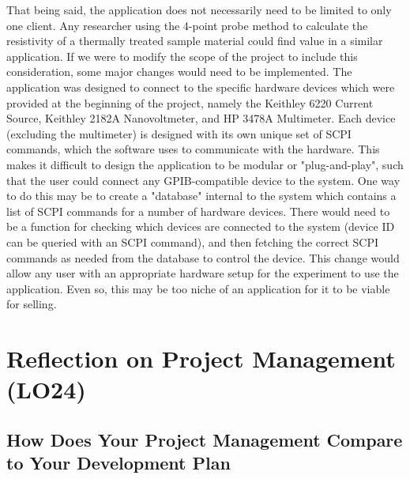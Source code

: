 \documentclass{article}
\begin{document}
\noindent That being said, the application does not necessarily need to be limited to only one client. Any researcher using the 4-point probe method to calculate the resistivity of a thermally treated sample material could find value in a similar application. If we were to modify the scope of the project to include this consideration, some major changes would need to be implemented. The application was designed to connect to the specific hardware devices which were provided at the beginning of the project, namely the Keithley 6220 Current Source, Keithley 2182A Nanovoltmeter, and HP 3478A Multimeter. Each device (excluding the multimeter) is designed with its own unique set of SCPI commands, which the software uses to communicate with the hardware. This makes it difficult to design the application to be modular or "plug-and-play", such that the user could connect any GPIB-compatible device to the system. One way to do this may be to create a "database" internal to the system which contains a list of SCPI commands for a number of hardware devices. There would need to be a function for checking which devices are connected to the system (device ID can be queried with an SCPI command), and then fetching the correct SCPI commands as needed from the database to control the device. This change would allow any user with an appropriate hardware setup for the experiment to use the application. Even so, this may be too niche of an application for it to be viable for selling. 


\section{Reflection on Project Management (LO24)}


\subsection{How Does Your Project Management Compare to Your Development Plan}

\end{document}
